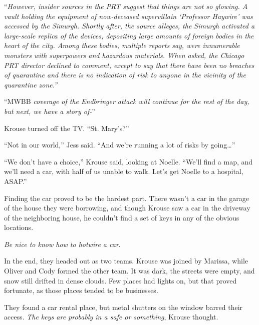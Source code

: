 ``\emph{However, insider sources in the PRT suggest that things are not so glowing.  A vault holding the equipment of now-deceased supervillain `Professor Haywire' was accessed by the Simurgh.  Shortly after, the source alleges, the Simurgh activated a large-scale replica of the devices, depositing large amounts of foreign bodies in the heart of the city.  Among these bodies, multiple reports say, were innumerable monsters with superpowers and hazardous materials.  When asked, the Chicago PRT director declined to comment, except to say that there have been no breaches of quarantine and there is no indication of risk to anyone in the vicinity of the quarantine zone.''}



``MWBB \emph{coverage of the Endbringer attack will continue for the rest of the day, but next, we have a story of-}''



Krouse turned off the TV.  ``St. Mary's?''



``Not in our world,'' Jess said.  ``And we're running a lot of risks by going\ldots''



``We don't have a choice,'' Krouse said, looking at Noelle. ``We'll find a map, and we'll need a car, with half of us unable to walk.  Let's get Noelle to a hospital, ASAP.''



\sectionbreak



Finding the car proved to be the hardest part.  There wasn't a car in the garage of the house they were borrowing, and though Krouse saw a car in the driveway of the neighboring house, he couldn't find a set of keys in any of the obvious locations.



\emph{Be nice to know how to hotwire a car}.



In the end, they headed out as two teams.  Krouse was joined by Marissa, while Oliver and Cody formed the other team.  It was dark, the streets were empty, and snow still drifted in dense clouds.  Few places had lights on, but that proved fortunate, as those places tended to be businesses.



They found a car rental place, but metal shutters on the window barred their access.  \emph{The keys are probably in a safe or something}, Krouse thought.



